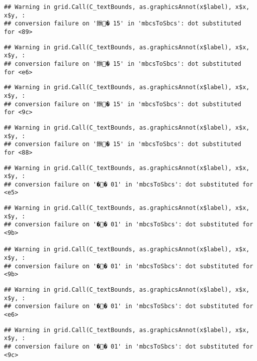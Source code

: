 \documentclass[]{article}
\begin{document}
\begin{verbatim}
## Warning in grid.Call(C_textBounds, as.graphicsAnnot(x$label), x$x, x$y, :
## conversion failure on '銝� 15' in 'mbcsToSbcs': dot substituted for <89>
\end{verbatim}

\begin{verbatim}
## Warning in grid.Call(C_textBounds, as.graphicsAnnot(x$label), x$x, x$y, :
## conversion failure on '銝� 15' in 'mbcsToSbcs': dot substituted for <e6>
\end{verbatim}

\begin{verbatim}
## Warning in grid.Call(C_textBounds, as.graphicsAnnot(x$label), x$x, x$y, :
## conversion failure on '銝� 15' in 'mbcsToSbcs': dot substituted for <9c>
\end{verbatim}

\begin{verbatim}
## Warning in grid.Call(C_textBounds, as.graphicsAnnot(x$label), x$x, x$y, :
## conversion failure on '銝� 15' in 'mbcsToSbcs': dot substituted for <88>
\end{verbatim}

\begin{verbatim}
## Warning in grid.Call(C_textBounds, as.graphicsAnnot(x$label), x$x, x$y, :
## conversion failure on '�� 01' in 'mbcsToSbcs': dot substituted for <e5>
\end{verbatim}

\begin{verbatim}
## Warning in grid.Call(C_textBounds, as.graphicsAnnot(x$label), x$x, x$y, :
## conversion failure on '�� 01' in 'mbcsToSbcs': dot substituted for <9b>

## Warning in grid.Call(C_textBounds, as.graphicsAnnot(x$label), x$x, x$y, :
## conversion failure on '�� 01' in 'mbcsToSbcs': dot substituted for <9b>
\end{verbatim}

\begin{verbatim}
## Warning in grid.Call(C_textBounds, as.graphicsAnnot(x$label), x$x, x$y, :
## conversion failure on '�� 01' in 'mbcsToSbcs': dot substituted for <e6>
\end{verbatim}

\begin{verbatim}
## Warning in grid.Call(C_textBounds, as.graphicsAnnot(x$label), x$x, x$y, :
## conversion failure on '�� 01' in 'mbcsToSbcs': dot substituted for <9c>
\end{verbatim}
\end{document}
